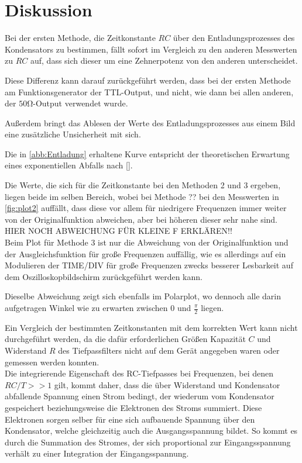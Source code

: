 \section{Diskussion}
\label{sec:Diskussion}
Bei der ersten Methode, die Zeitkonstante $RC$ über den Entladungsprozesses des Kondensators zu bestimmen, fällt sofort im Vergleich zu
den anderen Messwerten zu $RC$ auf, dass sich dieser um eine Zehnerpotenz von den anderen unterscheidet. 

Diese Differenz kann darauf zurückgeführt werden, dass bei der ersten Methode am Funktionsgenerator der TTL-Output, und nicht, wie dann bei allen anderen, der $50\unit{\ohm}$-Output verwendet wurde. 

Außerdem bringt das Ablesen der Werte des Entladungsprozesses aus einem Bild eine zusätzliche Unsicherheit mit sich.

Die in \autoref{abb:Entladung} erhaltene Kurve entspricht der theoretischen Erwartung eines exponentiellen Abfalls nach \eqref{}.

Die Werte, die sich für die Zeitkonstante bei den Methoden 2 und 3 ergeben, liegen beide im selben Bereich, wobei bei Methode ?? bei den Messwerten
in \autoref{fig:plot2} auffällt, dass diese vor allem für niedrigere Frequenzen immer weiter von der Originalfunktion abweichen, aber bei höheren dieser sehr nahe sind.\\
HIER NOCH ABWEICHUNG FÜR KLEINE F ERKLÄREN!!\\
Beim Plot für Methode 3 ist nur die Abweichung von der Originalfunktion und der Ausgleichsfunktion für große Frequenzen auffällig, wie es allerdings auf ein Modulieren der TIME/DIV
für große Frequenzen zwecks besserer Lesbarkeit auf dem Oszilloskopbildschirm zurückgeführt werden kann. 

Dieselbe Abweichung zeigt sich ebenfalls im Polarplot, wo dennoch alle
darin aufgetragen Winkel wie zu erwarten zwischen $0$ und $\frac{\pi}{2}$ liegen.

Ein Vergleich der bestimmten Zeitkonstanten mit dem korrekten Wert kann nicht durchgeführt werden, da die dafür erforderlichen Größen Kapazität $C$ und Widerstand $R$ des Tiefpassfilters
 nicht auf dem Gerät angegeben waren oder gemessen werden konnten.\\

Die integrierende Eigenschaft des RC-Tiefpasses bei Frequenzen, bei denen $RC/T >> 1$ gilt, kommt daher, dass 
die über Widerstand und Kondensator abfallende Spannung einen Strom bedingt, der wiederum vom Kondensator gespeichert
beziehungsweise die Elektronen des Stroms summiert. Diese Elektronen sorgen selber für eine sich aufbauende Spannung
über den Kondensator, welche gleichzeitig auch die Ausgangsspannung bildet. So kommt es durch die Summation des
Stromes, der sich proportional zur Eingangsspannung verhält zu einer Integration der Eingangsspannung.